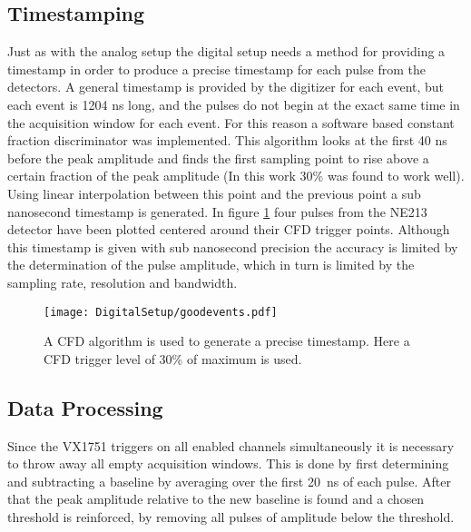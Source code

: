 \documentclass[main.tex]{subfiles}
\begin{document}
\subsection{Timestamping}
Just as with the analog setup the digital setup needs a method for providing a timestamp in order to produce a precise timestamp for each pulse from the detectors. A general timestamp is provided by the digitizer for each event, but each event is 1204 ns long, and the pulses do not begin at the exact same time in the acquisition window for each event. For this reason a software based constant fraction discriminator was implemented. This algorithm looks at the first 40 ns before the peak amplitude and finds the first sampling point to rise above  a certain fraction of the peak amplitude (In this work 30\% was found to work well). Using linear interpolation between this point and the previous point a sub nanosecond timestamp is generated. In figure \ref{fig:cfd_trig} four pulses from the NE213 detector have been plotted centered around their CFD trigger points. Although this timestamp is given with sub nanosecond precision the accuracy is limited by the determination of the pulse amplitude, which in turn is limited by the sampling rate, resolution and bandwidth. 

\begin{figure}[ht!]
    \centering
        \texttt{[image: DigitalSetup/goodevents.pdf]}
        \caption[Examples of digitized pulses and their CFD trigger points]{A CFD algorithm is used to generate a precise timestamp. Here a CFD trigger level of 30\% of maximum is used.}
    \label{fig:cfd_trig} 
\end{figure}

\subsection{Data Processing}
Since the VX1751 triggers on all enabled channels simultaneously it is necessary to throw away all empty acquisition windows. This is done by first determining and subtracting a baseline by averaging over the first \si{20\nano\second} of each pulse. After that the peak amplitude relative to the new baseline is found and a chosen threshold is reinforced, by removing all pulses of amplitude below the threshold.
\end{document}
